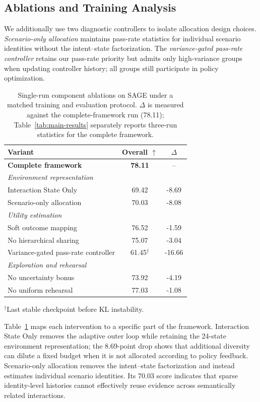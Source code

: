 \documentclass[letterpaper]{article}
\begin{document}
\subsection{Ablations and Training Analysis}
\label{sec:ablation}
We additionally use two diagnostic controllers to isolate allocation design choices. \emph{Scenario-only allocation} maintains pass-rate statistics for individual scenario identities without the intent--state factorization. The \emph{variance-gated pass-rate controller} retains our pass-rate priority but admits only high-variance groups when updating controller history; all groups still participate in policy optimization.

\begin{table}[t]
\centering
\small
\begin{tabular}{lcc}
\toprule
Variant & Overall $\uparrow$ & $\Delta$\\
\midrule
\textbf{Complete framework} & \textbf{78.11} & --\\
\midrule
\multicolumn{3}{l}{\emph{Environment representation}}\\
Interaction State Only & 69.42 & -8.69\\
Scenario-only allocation & 70.03 & -8.08\\
\midrule
\multicolumn{3}{l}{\emph{Utility estimation}}\\
Soft outcome mapping & 76.52 & -1.59\\
No hierarchical sharing & 75.07 & -3.04\\
Variance-gated pass-rate controller & 61.45$^\dagger$ & -16.66\\
\midrule
\multicolumn{3}{l}{\emph{Exploration and rehearsal}}\\
No uncertainty bonus & 73.92 & -4.19\\
No uniform rehearsal & 77.03 & -1.08\\
\bottomrule
\end{tabular}

{\small $^\dagger$Last stable checkpoint before KL instability.}
\caption{Single-run component ablations on SAGE under a matched training and evaluation protocol. $\Delta$ is measured against the complete-framework run (78.11); Table~\ref{tab:main-results} separately reports three-run statistics for the complete framework.}
\label{tab:ablation}
\end{table}

Table~\ref{tab:ablation} maps each intervention to a specific part of the framework. Interaction State Only removes the adaptive outer loop while retaining the 24-state environment representation; the 8.69-point drop shows that additional diversity can dilute a fixed budget when it is not allocated according to policy feedback. Scenario-only allocation removes the intent--state factorization and instead estimates individual scenario identities. Its 70.03 score indicates that sparse identity-level histories cannot effectively reuse evidence across semantically related interactions.
\end{document}
